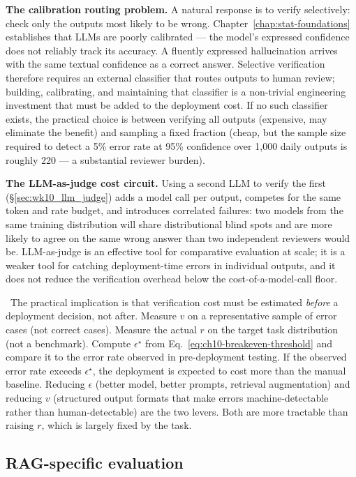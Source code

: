 \textbf{The calibration routing problem.} A natural response
is to verify selectively: check only the outputs most likely
to be wrong. Chapter~\ref{chap:stat-foundations} establishes that LLMs are poorly
calibrated --- the model's expressed confidence does not
reliably track its accuracy. A fluently expressed hallucination
arrives with the same textual confidence as a correct answer.
Selective verification therefore requires an external
classifier that routes outputs to human review; building,
calibrating, and maintaining that classifier is a non-trivial
engineering investment that must be added to the deployment
cost. If no such classifier exists, the practical choice
is between verifying all outputs (expensive, may eliminate
the benefit) and sampling a fixed fraction (cheap, but the
sample size required to detect a 5\% error rate at 95\%
confidence over 1{,}000 daily outputs is roughly 220 --- a
substantial reviewer burden).

\textbf{The LLM-as-judge cost circuit.} Using a second LLM
to verify the first (\S\ref{sec:wk10_llm_judge}) adds a
model call per output, competes for the same token and rate
budget, and introduces correlated failures: two models from
the same training distribution will share distributional
blind spots and are more likely to agree on the same wrong
answer than two independent reviewers would be. LLM-as-judge
is an effective tool for comparative evaluation at scale; it
is a weaker tool for catching deployment-time errors in
individual outputs, and it does not reduce the verification
overhead below the cost-of-a-model-call floor.

\Cons\ The practical implication is that verification cost
must be estimated \emph{before} a deployment decision, not
after. Measure $v$ on a representative sample of error cases
(not correct cases). Measure the actual $r$ on the target
task distribution (not a benchmark). Compute $\epsilon^\star$
from Eq.~\eqref{eq:ch10-breakeven-threshold} and compare it
to the error rate observed in pre-deployment testing. If
the observed error rate exceeds $\epsilon^\star$, the
deployment is expected to cost more than the manual baseline.
Reducing $\epsilon$ (better model, better prompts, retrieval
augmentation) and reducing $v$ (structured output formats that
make errors machine-detectable rather than human-detectable)
are the two levers. Both are more tractable than raising $r$,
which is largely fixed by the task.

\subsection{RAG-specific evaluation}
\label{sec:rag-eval}

